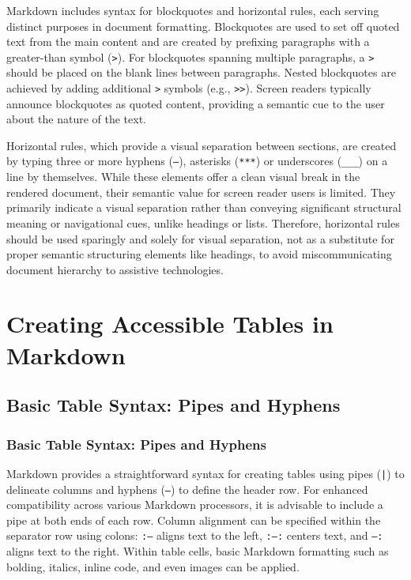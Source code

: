 Markdown includes syntax for blockquotes and horizontal rules, each serving distinct purposes in document formatting. Blockquotes are used to set off quoted text from the main content and are created by prefixing paragraphs with a greater-than symbol (\texttt{>}). \cite{MarkdownGuide} For blockquotes spanning multiple paragraphs, a \texttt{>} should be placed on the blank lines between paragraphs. \cite{MarkdownGuide} Nested blockquotes are achieved by adding additional \texttt{>} symbols (e.g., \texttt{>>}). \cite{MarkdownGuide} Screen readers typically announce blockquotes as quoted content, providing a semantic cue to the user about the nature of the text.

Horizontal rules, which provide a visual separation between sections, are created by typing three or more hyphens (\texttt{---}), asterisks (\texttt{***}) or underscores (\texttt{\_\_\_}) on a line by themselves. \cite{MarkdownGuide} While these elements offer a clean visual break in the rendered document, their semantic value for screen reader users is limited. They primarily indicate a visual separation rather than conveying significant structural meaning or navigational cues, unlike headings or lists. \cite{MSPowerShellMarkdown} Therefore, horizontal rules should be used sparingly and solely for visual separation, not as a substitute for proper semantic structuring elements like headings, to avoid miscommunicating document hierarchy to assistive technologies.

\section{Creating Accessible Tables in Markdown}
\label{sec:markdown-tables}

\subsection{Basic Table Syntax: Pipes and Hyphens}
\subsubsection{Basic Table Syntax: Pipes and Hyphens}

Markdown provides a straightforward syntax for creating tables using pipes (\texttt{|}) to delineate columns and hyphens (\texttt{---}) to define the header row. \cite{DocsToMarkdown,MarkdownGuideExtended} For enhanced compatibility across various Markdown processors, it is advisable to include a pipe at both ends of each row. \cite{DocsToMarkdown} Column alignment can be specified within the separator row using colons: \texttt{:---} aligns text to the left, \texttt{:---:} centers text, and \texttt{---:} aligns text to the right. \cite{DocsToMarkdown} Within table cells, basic Markdown formatting such as bolding, italics, inline code, and even images can be applied. \cite{DocsToMarkdown}

